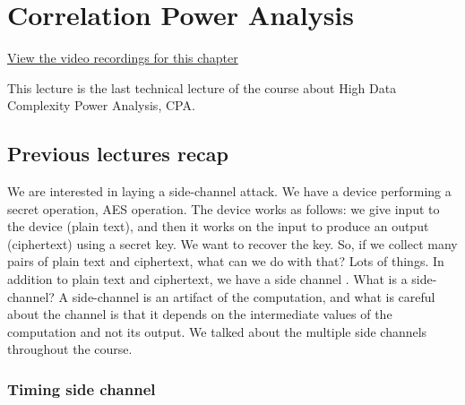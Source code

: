 \chapter{Correlation Power Analysis} \label{chap:c8_cpa}

\href{https://orenlab.sise.bgu.ac.il/AttacksonImplementationsCourseBook/#lecture-8---micro-architectural-side-channels}{View the video recordings for this chapter}

This lecture is the last technical lecture of the course about High Data
Complexity Power Analysis, CPA.

\section{Previous lectures recap}\label{c8_prev_lectures_recap:sec}

We are interested in laying a side-channel attack. We have a device performing
a secret operation, AES operation. The device works as follows: we give input to
the device (plain text), and then it works on the input to produce an output
(ciphertext) using a secret key. We want to recover the key. So, if we collect
many pairs of plain text and ciphertext, what can we do with that? Lots of
things. In addition to plain text and ciphertext, we have a side channel \cite{SideChannel}. What
is a side-channel? A side-channel is an artifact of the computation, and what is
careful about the channel is that it depends on the intermediate values of the
computation and not its output. We talked about the multiple side channels
throughout the course.

\subsection{Timing side channel}\label{c8_prev_lectures_recap_timing_sc:subsec}

